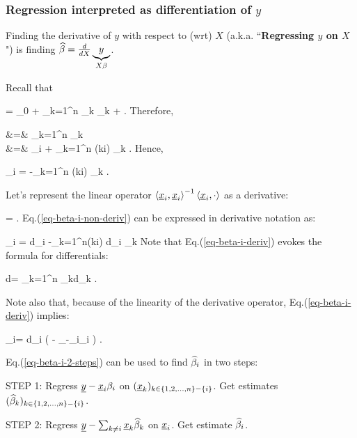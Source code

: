 \subsubsection{Regression
 interpreted as differentiation
 of $y$}

Finding the derivative of $y$
with respect to (wrt) $X$
(a.k.a. ``{\bf Regressing $y$ on $X$}")
is finding
$\widehat{\beta}=\frac{d}{dX}
\underbrace{y}_{X\beta}$.

Recall that

\beq
\rvy = \beta_0 + \sum_{k=1}^n \rvx_k \beta_k + \ul{\eps}
\;.
\eeq
Therefore,

\beqa
{}
&=&
\sum_{k=1}^n \beta_k
\\
&=&
 \beta_i
+
\sum_{k=1}^n
\indi(k\neq i)
 \beta_k
\;.
\eeqa
Hence,

\beq
\beta_i
=
{}
-\sum_{k=1}^n
\indi(k\neq i)
{}
\beta_k
\;.
\label{eq-beta-i-non-deriv}
\eeq

Let's represent
the linear
operator
$\left\langle{\underline{x}}_i, {\underline{x}}_i\right\rangle^{-1}\left\langle{\underline{x}}_i, \cdot\right\rangle
$ as a derivative:

\beq
{}=
{}
\;.
\eeq
Eq.(\ref{eq-beta-i-non-deriv})
can be expressed
in derivative notation as:

\beq
\beta_i
=
{d\rvx_i}
-\sum_{k=1}^n\indi(k\neq i)
{d\rvx_i}
\beta_k
\label{eq-beta-i-deriv}
\eeq
Note that Eq.(\ref{eq-beta-i-deriv})
evokes the formula for differentials:

\beq
d\rvy=
\sum_{k=1}^n \beta_kd\rvx_k
\;.
\eeq

Note also that,
because of the
linearity of the derivative operator,
Eq.(\ref{eq-beta-i-deriv})
implies:

\beq
\beta_i=
{d\rvx_i}
\left(\rvy
-
_{\rvy-\rvx_i\beta_i}
\right)
\label{eq-beta-i-2-steps}
\;.
\eeq

Eq.(\ref{eq-beta-i-2-steps})
can be used to find
$\widehat{\beta}_i$
in two steps:

STEP 1: Regress ${\underline{y}}-{\underline{x}}_i\beta_i$
on $({\underline{x}}_k)_{k\in \{1,2,
\ldots, n\}- \{ i\}}$.
Get estimates
$(\widehat{\beta}_k)_{k\in \{1,2,
\ldots, n\}- \{ i\}}$.

STEP 2: Regress ${\underline{y}}-\sum_{k\neq i} {\underline{x}}_k\widehat{\beta}_k$ on ${\underline{x}}_i$.
Get estimate $\widehat{\beta}_i$.

